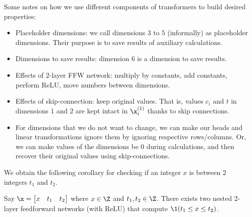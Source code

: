 \begin{remark}
    Some notes on how we use different components of transformers to build desired properties:
    \begin{itemize}
        \item Placeholder dimensions: we call dimensions $3$ to $5$ (informally) as placeholder dimensions. Their purpose is to save results of auxiliary calculations.  
        \item Dimensions to save results: dimension $6$ is a dimension to save results. 
        \item Effects of 2-layer FFW network: multiply by constants, add constants, perform ReLU, move numbers between dimensions.
        \item Effects of skip-connection: keep original values. That is, values $c_i$ and $t$ in dimensions $1$ and $2$ are kept intact in $\x_i^{(1)}$ thanks to skip connections. 
        \item For dimensions that we do not want to change, we can make our heads and linear transformations ignore them by ignoring respective rows/columns. Or, we can make values of the dimensions be $0$ during calculations, and then recover their original values using skip-connections.  
    \end{itemize}
\end{remark}






We obtain the following corollary for checking if an integer $x$ is between 2 integers $t_1$ and $t_2$. 

\begin{corollary} \label{cor:check t_1 <= x <= t-2}
    Say $\x = \begin{bmatrix}
        x &t_1 & t_2 
    \end{bmatrix}$ where $x \in \Z$ and $t_1, t_2 \in \Z$. There exists two nested 2-layer feedforward networks (with ReLU) that compute $\1(t_1 \leq x \leq t_2)$. 
\end{corollary}

